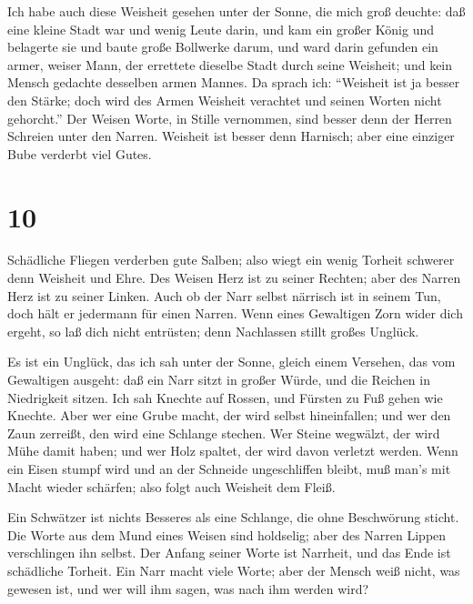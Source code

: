  Ich habe auch diese Weisheit gesehen unter der Sonne, die
mich groß deuchte:  daß eine kleine Stadt war und wenig
Leute darin, und kam ein großer König und belagerte sie und baute große
Bollwerke darum,  und ward darin gefunden ein armer, weiser
Mann, der errettete dieselbe Stadt durch seine Weisheit; und kein Mensch
gedachte desselben armen Mannes.  Da sprach ich: ``Weisheit
ist ja besser den Stärke; doch wird des Armen Weisheit verachtet und
seinen Worten nicht gehorcht.''  Der Weisen Worte, in
Stille vernommen, sind besser denn der Herren Schreien unter den Narren.
 Weisheit ist besser denn Harnisch; aber eine einziger Bube
verderbt viel Gutes.

\hypertarget{section-9}{%
\section{10}\label{section-9}}

 Schädliche Fliegen verderben gute Salben; also wiegt ein
wenig Torheit schwerer denn Weisheit und Ehre.  Des Weisen
Herz ist zu seiner Rechten; aber des Narren Herz ist zu seiner Linken.
 Auch ob der Narr selbst närrisch ist in seinem Tun, doch
hält er jedermann für einen Narren.  Wenn eines Gewaltigen
Zorn wider dich ergeht, so laß dich nicht entrüsten; denn Nachlassen
stillt großes Unglück.

 Es ist ein Unglück, das ich sah unter der Sonne, gleich
einem Versehen, das vom Gewaltigen ausgeht:  daß ein Narr
sitzt in großer Würde, und die Reichen in Niedrigkeit sitzen.
 Ich sah Knechte auf Rossen, und Fürsten zu Fuß gehen wie
Knechte.  Aber wer eine Grube macht, der wird selbst
hineinfallen; und wer den Zaun zerreißt, den wird eine Schlange stechen.
 Wer Steine wegwälzt, der wird Mühe damit haben; und wer
Holz spaltet, der wird davon verletzt werden.  Wenn ein
Eisen stumpf wird und an der Schneide ungeschliffen bleibt, muß man's
mit Macht wieder schärfen; also folgt auch Weisheit dem Fleiß.

 Ein Schwätzer ist nichts Besseres als eine Schlange, die
ohne Beschwörung sticht.  Die Worte aus dem Mund eines
Weisen sind holdselig; aber des Narren Lippen verschlingen ihn selbst.
 Der Anfang seiner Worte ist Narrheit, und das Ende ist
schädliche Torheit.  Ein Narr macht viele Worte; aber der
Mensch weiß nicht, was gewesen ist, und wer will ihm sagen, was nach ihm
werden wird?

